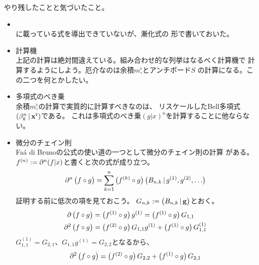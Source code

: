 {	\begin{todo}[やるべきこと]\label{todo:やるべきこと} %
		やり残したことと気づいたこと。
		\begin{itemize}\setlength{\itemsep}{-1mm} %
			\item {} \\
			\cite{Figueroa:2005}に載っている式を導出できていないが、漸化式の
			形で書いておいた。
			\item 計算機 \\
			上記の計算は絶対間違えている。組み合わせ的な列挙はなるべく計算機で
			計算するようにしよう。厄介なのは余積$m_\circ^\flat$とアンチポード$S$
			の計算になる。この二つを何とかしたい。
			\item 多項式のべき乗 \\
			余積$m_\circ^\flat$の計算で実質的に計算すべきなのは、
			リスケールしたBell多項式$(\beta^n_k\,\vert\,\mathbf{x}^\flat)$である。
			これは多項式のべき乗$(g|x)^n$を計算することに他ならない。
			\item 微分のチェイン則 \\
			Fa\'a di Brunoの公式の使い道の一つとして微分のチェイン則の計算
			がある。$f^{(n)}:={\partial}^n(f|x)$と書くと次の式が成り立つ。
			\begin{equation*}\begin{split}
				{\partial}^n\mathinner{\bigl({f\circ g}\bigr)} = \sum_{k=1}^n 
				\mathinner{\bigl({f^{(k)}\circ g}\bigr)}\mathinner{\bigl({B_{n,k}\,\vert\,g^{(1)},g^{(2)},\dots}\bigr)}
			\end{split}\end{equation*}
			証明する前に低次の項を見ておこう。
			$G_{n,k}:=\mathinner{\bigl({B_{n,k}\,\vert\,\mathbf{g}}\bigr)}$とおく。
			\begin{equation*}\begin{split}
				{\partial}\mathinner{\bigl({f\circ g}\bigr)} &= \mathinner{\bigl({f^{(1)}\circ g}\bigr)}g^{(1)} 
				= \mathinner{\bigl({f^{(1)}\circ g}\bigr)}G_{1,1} \\
				{\partial}^2\mathinner{\bigl({f\circ g}\bigr)} &= \mathinner{\bigl({f^{(2)}\circ g}\bigr)}G_{1,1}g^{(1)}
				+ \mathinner{\bigl({f^{(1)}\circ g}\bigr)}G_{1,1}^{(1)}
			\end{split}\end{equation*}
			$G_{1,1}^{(1)}=G_{2,1}$、$G_{1,1}g^{(1)}=G_{2,2}$となるから、
			\begin{equation*}\begin{split}
				{\partial}^2\mathinner{\bigl({f\circ g}\bigr)} = \mathinner{\bigl({f^{(2)}\circ g}\bigr)}G_{2,2}
				+ \mathinner{\bigl({f^{(1)}\circ g}\bigr)}G_{2,1}
			\end{split}\end{equation*}

\end{itemize}
\end{todo}}
